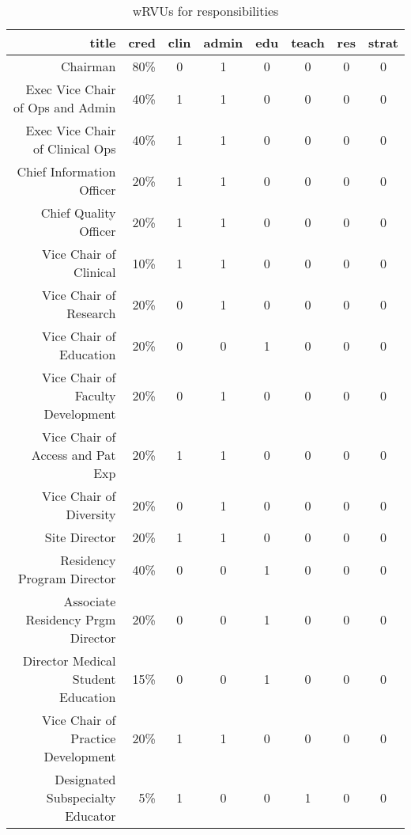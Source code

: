 \begin{table}[H]
\centering
\caption{wRVUs for responsibilities}
\label{tab:sample_table}
\begin{tabular}{|r|r|c|c|c|c|c|c|}
\toprule
                              title & cred &  clin &  admin &  edu &  teach &  res &  strat \\
\midrule
                           Chairman &  80\% &     0 &      1 &    0 &      0 &    0 &      0 \\
   Exec Vice Chair of Ops and Admin &  40\% &     1 &      1 &    0 &      0 &    0 &      0 \\
    Exec Vice Chair of Clinical Ops &  40\% &     1 &      1 &    0 &      0 &    0 &      0 \\
          Chief Information Officer &  20\% &     1 &      1 &    0 &      0 &    0 &      0 \\
              Chief Quality Officer &  20\% &     1 &      1 &    0 &      0 &    0 &      0 \\
             Vice Chair of Clinical &  10\% &     1 &      1 &    0 &      0 &    0 &      0 \\
             Vice Chair of Research &  20\% &     0 &      1 &    0 &      0 &    0 &      0 \\
            Vice Chair of Education &  20\% &     0 &      0 &    1 &      0 &    0 &      0 \\
  Vice Chair of Faculty Development &  20\% &     0 &      1 &    0 &      0 &    0 &      0 \\
   Vice Chair of Access and Pat Exp &  20\% &     1 &      1 &    0 &      0 &    0 &      0 \\
            Vice Chair of Diversity &  20\% &     0 &      1 &    0 &      0 &    0 &      0 \\
                      Site Director &  20\% &     1 &      1 &    0 &      0 &    0 &      0 \\
         Residency Program Director &  40\% &     0 &      0 &    1 &      0 &    0 &      0 \\
  Associate Residency Prgm Director &  20\% &     0 &      0 &    1 &      0 &    0 &      0 \\
 Director Medical Student Education &  15\% &     0 &      0 &    1 &      0 &    0 &      0 \\
Vice Chair of  Practice Development &  20\% &     1 &      1 &    0 &      0 &    0 &      0 \\
   Designated Subspecialty Educator &   5\% &     1 &      0 &    0 &      1 &    0 &      0 \\

\end{tabular}
\end{table}
